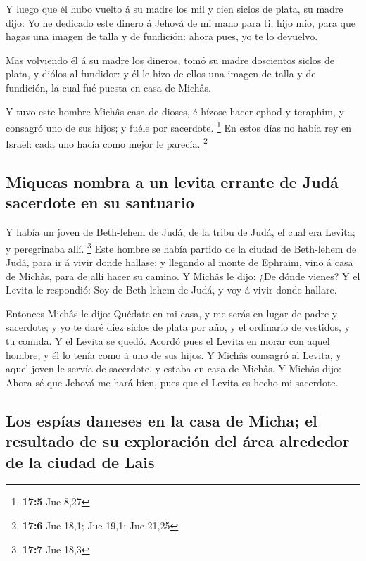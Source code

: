  Y luego que él hubo vuelto á su madre los mil y cien siclos
de plata, su madre dijo: Yo he dedicado este dinero á Jehová de mi mano
para ti, hijo mío, para que hagas una imagen de talla y de fundición:
ahora pues, yo te lo devuelvo.

 Mas volviendo él á su madre los dineros, tomó su madre
doscientos siclos de plata, y diólos al fundidor: y él le hizo de ellos
una imagen de talla y de fundición, la cual fué puesta en casa de
Michâs.

 Y tuvo este hombre Michâs casa de dioses, é hízose hacer
ephod y teraphim, y consagró uno de sus hijos; y fuéle por sacerdote.
\footnote{\textbf{17:5} Jue 8,27}  En estos días no había
rey en Israel: cada uno hacía como mejor le parecía. \footnote{\textbf{17:6}
  Jue 18,1; Jue 19,1; Jue 21,25}

\hypertarget{miqueas-nombra-a-un-levita-errante-de-juduxe1-sacerdote-en-su-santuario}{%
\subsection{Miqueas nombra a un levita errante de Judá sacerdote en su
santuario}\label{miqueas-nombra-a-un-levita-errante-de-juduxe1-sacerdote-en-su-santuario}}

 Y había un joven de Beth-lehem de Judá, de la tribu de
Judá, el cual era Levita; y peregrinaba allí. \footnote{\textbf{17:7}
  Jue 18,3}  Este hombre se había partido de la ciudad de
Beth-lehem de Judá, para ir á vivir donde hallase; y llegando al monte
de Ephraim, vino á casa de Michâs, para de allí hacer su camino.
 Y Michâs le dijo: ¿De dónde vienes? Y el Levita le
respondió: Soy de Beth-lehem de Judá, y voy á vivir donde hallare.

 Entonces Michâs le dijo: Quédate en mi casa, y me serás en
lugar de padre y sacerdote; y yo te daré diez siclos de plata por año, y
el ordinario de vestidos, y tu comida. Y el Levita se quedó.
 Acordó pues el Levita en morar con aquel hombre, y él lo
tenía como á uno de sus hijos.  Y Michâs consagró al
Levita, y aquel joven le servía de sacerdote, y estaba en casa de
Michâs.  Y Michâs dijo: Ahora sé que Jehová me hará bien,
pues que el Levita es hecho mi sacerdote.

\hypertarget{los-espuxedas-daneses-en-la-casa-de-micha-el-resultado-de-su-exploraciuxf3n-del-uxe1rea-alrededor-de-la-ciudad-de-lais}{%
\subsection{Los espías daneses en la casa de Micha; el resultado de su
exploración del área alrededor de la ciudad de
Lais}\label{los-espuxedas-daneses-en-la-casa-de-micha-el-resultado-de-su-exploraciuxf3n-del-uxe1rea-alrededor-de-la-ciudad-de-lais}}

